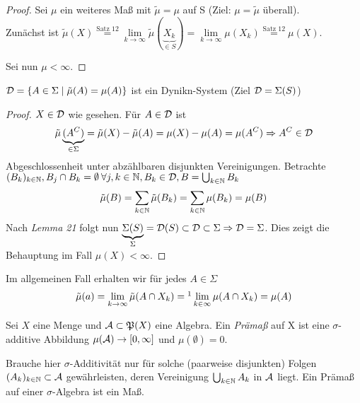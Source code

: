 \documentclass[skript.tex]{subfiles}
\begin{document}
	\begin{proof}
		Sei $\mu$ ein weiteres Maß mit $\tilde{\mu}=\mu$ auf S (Ziel: $\mu=\tilde{\mu}$ überall).\\
		Zunächst ist $\tilde{\mu}(X)\stackrel{\textrm{Satz 12}}=\lim\limits_{k \to \infty}\tilde{\mu}(\underbrace{X_k}_{\in S})=\lim\limits_{k \to \infty}\mu(X_k)\stackrel{\textrm{Satz 12}}=\mu(X)$.
		
		Sei nun $\mu<\infty$.
	\end{proof}

	\begin{beh*}
		$\mathcal{D}=\{A\in \Sigma \mid \tilde{\mu}(A)=\mu(A)\}$ ist ein Dynikn-System (Ziel $\mathcal{D}=\Sigma(S)$)
	\end{beh*}

	\begin{proof}
		$X\in\mathcal{D}$ wie gesehen. Für $A\in\mathcal{D}$ ist
		\begin{equation*}
			\tilde{\mu}\underbrace{(A^C)}_{\in\Sigma}=\tilde{\mu}(X)-\tilde{\mu}(A)=\mu(X)-\mu(A)=\mu(A^C) \Rightarrow A^C\in\mathcal{D}
		\end{equation*}
	Abgeschlossenheit unter abzählbaren disjunkten Vereinigungen.
	Betrachte $(B_k)_{k\in\mathbb{N}},\\ B_j\cap B_k=\emptyset \: \forall j,k \in \mathbb{N}, B_k \in \mathcal{D}, B=\bigcup_{k \in\mathbb{N}} B_k$
	\begin{equation*}
		\tilde{\mu}(B)= \sum_{k\in \mathbb{N}}\tilde{\mu}(B_k)=\sum_{k\in \mathbb{N}}\mu(B_k)=\mu(B)
	\end{equation*}
	Nach \textit{Lemma 21} folgt nun $\underbrace{\Sigma(S)}_{\Sigma}=\mathcal{D}(S) \subset \mathcal{D} \subset \Sigma \Rightarrow \mathcal{D}=\Sigma$. Dies zeigt die Behauptung im Fall $\mu(X)<\infty$.
	\end{proof}

	Im allgemeinen Fall erhalten wir für jedes $A\in\Sigma$
	\begin{equation*}
		\tilde{\mu}(a)=\lim\limits_{k \to \infty}\tilde{\mu}(A \cap X_k)=\footnotemark \lim\limits_{k\in\infty}\mu(A\cap X_k)=\mu(A)
	\end{equation*}

	\begin{defin}[Prämaß]
		Sei $X$ eine Menge und $\mathcal{A} \subset \mathfrak{P}(X)$ eine Algebra. Ein \textit{Prämaß} auf X ist eine $\sigma$-additive Abbildung $\mu(\mathcal{A}) \to [0,\infty]$ und $ \mu(\emptyset)=0$.
	\end{defin}

	\begin{bem*}
		Brauche hier $\sigma$-Additivität nur für solche (paarweise disjunkten) Folgen \\$(A_k)_{k\in\mathbb{N}} \subset \mathcal{A}$ gewährleisten, deren Vereinigung $\bigcup_{k\in\mathbb{N}}A_k$ in $\mathcal{A}$ liegt. Ein Prämaß auf einer $\sigma$-Algebra ist ein Maß.
	\end{bem*}
\end{document}
